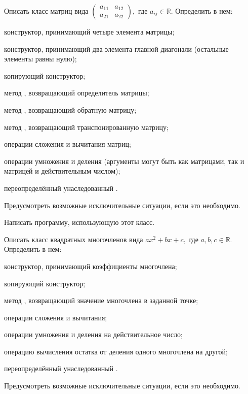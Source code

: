 \task Описать класс  матриц вида $\begin{pmatrix}
  a_{11} & a_{12} \\
  a_{21} & a_{22}
\end{pmatrix},$ где $a_{ij} \in \mathbb{R}$. Определить в нем:
\begin{itemize*}
\item конструктор, принимающий четыре элемента матрицы;
\item конструктор, принимающий два элемента главной диагонали
  (остальные элементы равны нулю);
\item копирующий конструктор;
\item метод , возвращающий определитель матрицы;
\item метод , возвращающий обратную матрицу;
\item метод , возвращающий транспонированную матрицу;
\item операции сложения и вычитания матриц;
\item операции умножения и деления (аргументы могут быть как матрицами,
  так и матрицей и действительным числом);
\item переопределённый унаследованный .
\end{itemize*}

Предусмотреть возможные исключительные ситуации, если это необходимо.

Написать программу, использующую этот класс.

\task Описать класс  квадратных многочленов вида
$ax^2+bx+c,$ где $a,b,c \in \mathbb{R}$. Определить в нем:
\begin{itemize*}
\item конструктор, принимающий коэффициенты многочлена;
\item копирующий конструктор;
\item метод , возвращающий значение многочлена в заданной
  точке;
\item операции сложения и вычитания;
\item операции умножения и деления на действительное число;
\item операцию вычисления остатка от деления одного многочлена на
  другой;
\item переопределённый унаследованный .
\end{itemize*}

Предусмотреть возможные исключительные ситуации, если это необходимо.

